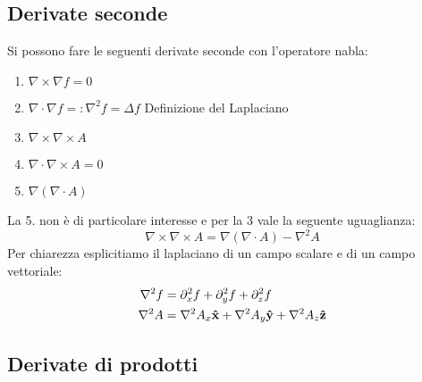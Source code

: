 
\subsection{Derivate seconde} %
\label{sub:derivate_seconde}

Si possono fare le seguenti derivate seconde con l'operatore nabla:
\begin{enumerate}
    \item $\nabla \times \nabla f = 0 $ 
    \item $\nabla \cdot \nabla f =: \nabla^2 f = \Delta f$ Definizione del Laplaciano
    \item $\nabla \times \nabla \times A$ 
    \item $\nabla \cdot \nabla \times A = 0$ 
    \item $\nabla (\nabla \cdot A)$ 
\end{enumerate}
La 5. non è di particolare interesse e per la 3 vale la seguente uguaglianza:
\begin{equation}
    \nabla \times \nabla \times A = \nabla (\nabla \cdot A) - \nabla^2 A
\end{equation}
Per chiarezza esplicitiamo il laplaciano di un campo scalare e di un campo vettoriale:
\begin{align}
    \nabla^2 f &= \partial_x^2 f + \partial_y^2 f + \partial_z^2 f \\
    \nabla^2 A &= \nabla^2 A_x \mathbf{\hat x } + \nabla^2 A_y \mathbf{\hat y } + \nabla^2 A_z \mathbf{\hat z }
\end{align}


\subsection{Derivate di prodotti} %
\label{sub:derivate_di_prodotti}

